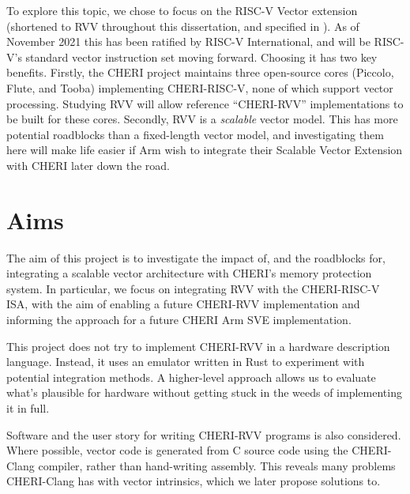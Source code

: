 To explore this topic, we chose to focus on the RISC-V Vector extension (shortened to RVV throughout this dissertation, and specified in ).
As of November 2021 this has been ratified by RISC-V International, and will be RISC-V's standard vector instruction set moving forward.
Choosing it has two key benefits.
Firstly, the CHERI project maintains three open-source cores (Piccolo, Flute, and Tooba) implementing CHERI-RISC-V, none of which support vector processing.
Studying RVV will allow reference \enquote{CHERI-RVV} implementations to be built for these cores.
Secondly, RVV is a \emph{scalable} vector model.
This has more potential roadblocks than a fixed-length vector model, and investigating them here will make life easier if Arm wish to integrate their Scalable Vector Extension with CHERI later down the road.

\section{Aims}
The aim of this project is to investigate the impact of, and the roadblocks for, integrating a scalable vector architecture with CHERI's memory protection system.
In particular, we focus on integrating RVV with the CHERI-RISC-V ISA, with the aim of enabling a future CHERI-RVV implementation and informing the approach for a future CHERI Arm SVE implementation.

This project does not try to implement CHERI-RVV in a hardware description language.
Instead, it uses an emulator written in Rust to experiment with potential integration methods.
A higher-level approach allows us to evaluate what's plausible for hardware without getting stuck in the weeds of implementing it in full.

Software and the user story for writing CHERI-RVV programs is also considered. 
Where possible, vector code is generated from C source code using the CHERI-Clang compiler, rather than hand-writing assembly.
This reveals many problems CHERI-Clang has with vector intrinsics, which we later propose solutions to.

